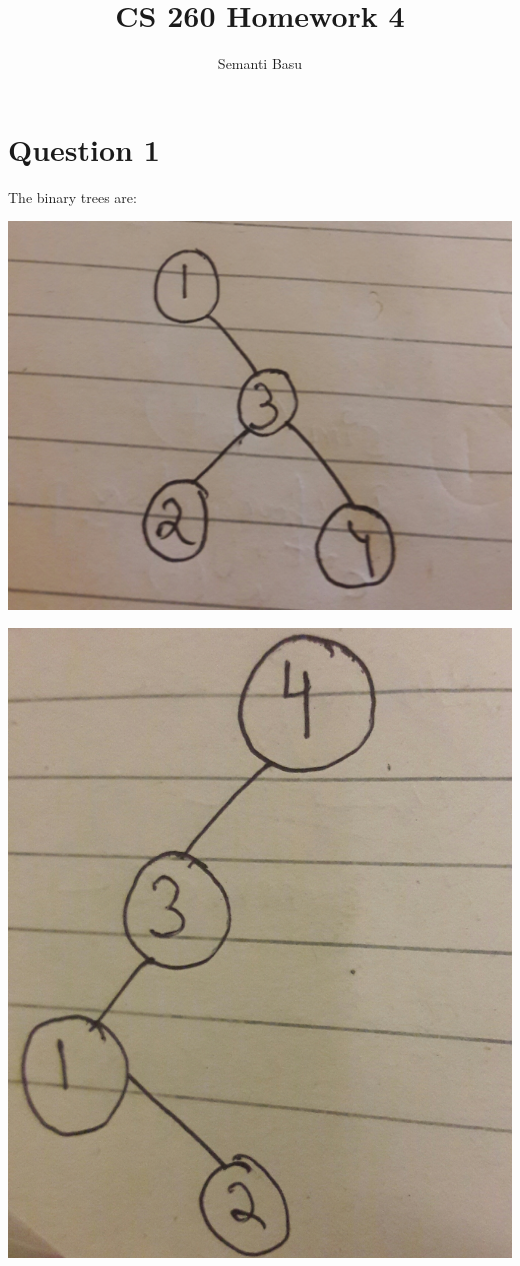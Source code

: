 \documentclass{article}
\begin{document}
\title {CS 260 Homework 4}
\author{Semanti Basu}
\maketitle


\section*{Question 1}
The binary trees are:



\includegraphics[scale=0.05]{1.jpg}



\includegraphics[scale=0.05]{2.jpg}
\end{document}
